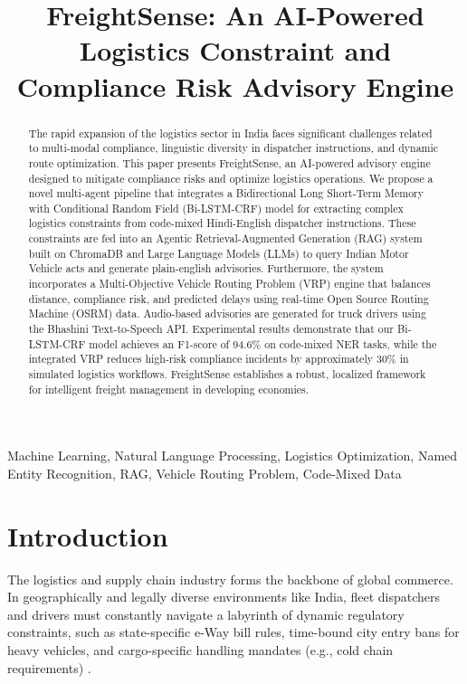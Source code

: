\documentclass[conference]{IEEEtran}
\begin{document}
\title{FreightSense: An AI-Powered Logistics Constraint and Compliance Risk Advisory Engine}

\author{
}

\maketitle

\begin{abstract}
The rapid expansion of the logistics sector in India faces significant challenges related to multi-modal compliance, linguistic diversity in dispatcher instructions, and dynamic route optimization. This paper presents FreightSense, an AI-powered advisory engine designed to mitigate compliance risks and optimize logistics operations. We propose a novel multi-agent pipeline that integrates a Bidirectional Long Short-Term Memory with Conditional Random Field (Bi-LSTM-CRF) model for extracting complex logistics constraints from code-mixed Hindi-English dispatcher instructions. These constraints are fed into an Agentic Retrieval-Augmented Generation (RAG) system built on ChromaDB and Large Language Models (LLMs) to query Indian Motor Vehicle acts and generate plain-english advisories. Furthermore, the system incorporates a Multi-Objective Vehicle Routing Problem (VRP) engine that balances distance, compliance risk, and predicted delays using real-time Open Source Routing Machine (OSRM) data. Audio-based advisories are generated for truck drivers using the Bhashini Text-to-Speech API. Experimental results demonstrate that our Bi-LSTM-CRF model achieves an F1-score of 94.6\% on code-mixed NER tasks, while the integrated VRP reduces high-risk compliance incidents by approximately 30\% in simulated logistics workflows. FreightSense establishes a robust, localized framework for intelligent freight management in developing economies.
\end{abstract}

\begin{IEEEkeywords}
Machine Learning, Natural Language Processing, Logistics Optimization, Named Entity Recognition, RAG, Vehicle Routing Problem, Code-Mixed Data
\end{IEEEkeywords}

\section{Introduction}
\label{sec:introduction}
The logistics and supply chain industry forms the backbone of global commerce. In geographically and legally diverse environments like India, fleet dispatchers and drivers must constantly navigate a labyrinth of dynamic regulatory constraints, such as state-specific e-Way bill rules, time-bound city entry bans for heavy vehicles, and cargo-specific handling mandates (e.g., cold chain requirements) \cite{logistics_india}.
\end{document}

